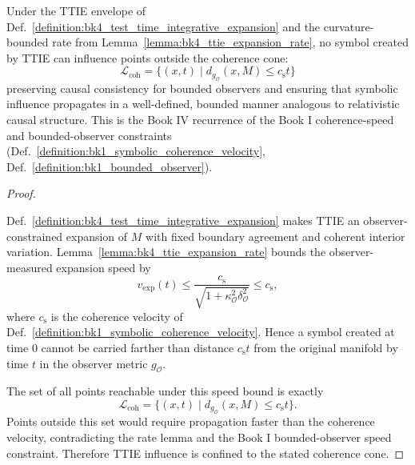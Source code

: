 \begin{corollary}
\label{corollary:bk4_symbolic_lightcone}
Under the TTIE envelope of Def.~\ref{definition:bk4_test_time_integrative_expansion} and the curvature-bounded rate from Lemma~\ref{lemma:bk4_ttie_expansion_rate}, no symbol created by TTIE can influence points outside the coherence cone:
\[
\mathcal{L}_{\text{coh}}\!=\!\{(x,t)\mid d_{g_{\mathcal{O}}}(x,M)\le c_{\text{s}}t\}
\]
preserving causal consistency for bounded observers and ensuring that symbolic influence propagates in a well-defined, bounded manner analogous to relativistic causal structure. This is the Book IV recurrence of the Book I coherence-speed and bounded-observer constraints (Def.~\ref{definition:bk1_symbolic_coherence_velocity}, Def.~\ref{definition:bk1_bounded_observer}).
\end{corollary}

\begin{proof}
\label{proof:bk4_symbolic_lightcone}
\leavevmode

Def.~\ref{definition:bk4_test_time_integrative_expansion} makes TTIE an
observer-constrained expansion of $M$ with fixed boundary agreement and coherent
interior variation. Lemma~\ref{lemma:bk4_ttie_expansion_rate} bounds the
observer-measured expansion speed by
\[
v_{\mathrm{exp}}(t)\leq
\frac{c_{\mathrm{s}}}{\sqrt{1+\kappa_{\mathcal O}^2\delta_{\mathcal O}^2}}
\leq c_{\mathrm{s}},
\]
where $c_{\mathrm{s}}$ is the coherence velocity of
Def.~\ref{definition:bk1_symbolic_coherence_velocity}. Hence a symbol created at
time $0$ cannot be carried farther than distance $c_{\mathrm{s}}t$ from the
original manifold by time $t$ in the observer metric $g_{\mathcal O}$.

The set of all points reachable under this speed bound is exactly
\[
\mathcal{L}_{\mathrm{coh}}
 = \{(x,t)\mid d_{g_{\mathcal O}}(x,M)\leq c_{\mathrm{s}}t\}.
\]
Points outside this set would require propagation faster than the coherence
velocity, contradicting the rate lemma and the Book I bounded-observer speed
constraint. Therefore TTIE influence is confined to the stated coherence cone.
\end{proof}

